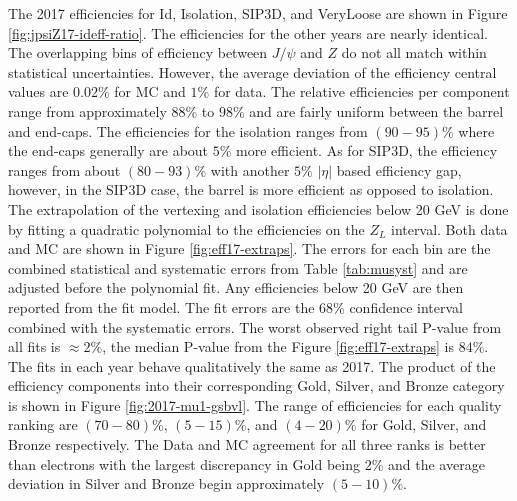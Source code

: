  The 2017 efficiencies for Id, Isolation, SIP3D, and VeryLoose are shown in Figure \ref{fig:jpsiZ17-ideff-ratio}. The efficiencies for the other years are nearly identical. The overlapping bins of efficiency between $J/\psi$ and $Z$ do not all match within statistical uncertainties. However, the average deviation of the efficiency central values are $0.02\%$ for MC and $1\%$ for data.  The relative efficiencies per component range from approximately $88\%$ to $98\%$ and are fairly uniform between the barrel and end-caps. The efficiencies for the isolation ranges from $(90 - 95)\%$ where the end-caps generally are about $5\%$ more efficient. As for SIP3D, the efficiency ranges from about $(80 - 93)\%$ with another $5\%$ $|\eta|$ based efficiency gap, however, in the SIP3D case, the barrel is more efficient as opposed to isolation.  The extrapolation of the vertexing and isolation efficiencies below 20 GeV is done by fitting a quadratic polynomial to the efficiencies on the $Z_L$ interval.  Both data and MC are shown in Figure \ref{fig:eff17-extraps}.  The errors for each bin are the combined statistical and systematic errors from Table \ref{tab:musyst} and are adjusted before the polynomial fit. Any efficiencies below 20 GeV are then reported from the fit model. The fit errors are the 68\% confidence interval combined with the systematic errors. The worst observed right tail P-value from all fits is $\approx 2\%$, the median P-value from the Figure \ref{fig:eff17-extraps} is $84\%$. The fits in each year behave qualitatively the same as 2017.
The product of the efficiency components into their corresponding Gold, Silver, and Bronze category is shown in Figure \ref{fig:2017-mu1-gsbvl}. The range of efficiencies for each quality ranking are $(70 - 80)\%$, $(5 - 15)\%$, and $(4 - 20)\%$ for Gold, Silver, and Bronze respectively. The Data and MC agreement for all three ranks is better than electrons with the largest discrepancy in Gold being $2\%$ and the average deviation in Silver and Bronze begin approximately $(5-10)\%$.




